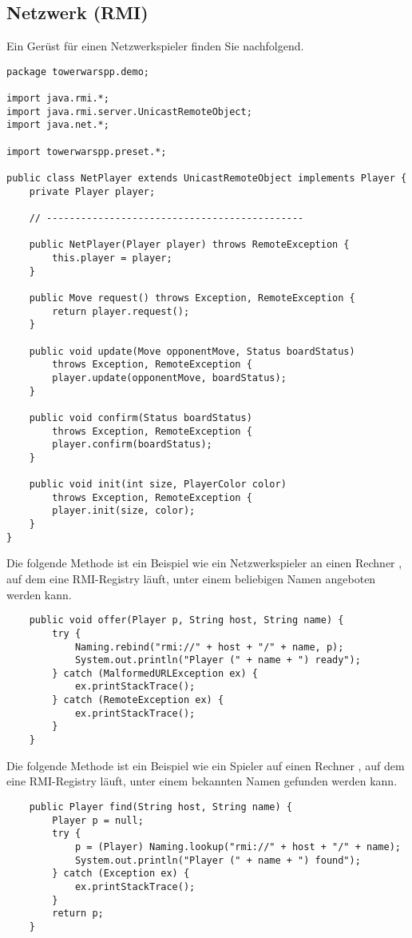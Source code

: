 \newpage
\subsection*{Netzwerk (RMI)}
Ein Gerüst für einen Netzwerkspieler finden Sie nachfolgend.
\begin{lstlisting}
package towerwarspp.demo;

import java.rmi.*;
import java.rmi.server.UnicastRemoteObject;
import java.net.*;

import towerwarspp.preset.*;

public class NetPlayer extends UnicastRemoteObject implements Player {
	private Player player;
	
	// ---------------------------------------------
	
	public NetPlayer(Player player) throws RemoteException {
		this.player = player;
	}
	
	public Move request() throws Exception, RemoteException {
		return player.request();
	}
	
	public void update(Move opponentMove, Status boardStatus)
		throws Exception, RemoteException {
		player.update(opponentMove, boardStatus);
	}
	
	public void confirm(Status boardStatus)
		throws Exception, RemoteException {
		player.confirm(boardStatus);
	}		
	
	public void init(int size, PlayerColor color)
		throws Exception, RemoteException {
		player.init(size, color);	
	} 
}
\end{lstlisting}

Die folgende Methode  ist ein Beispiel wie ein Netzwerkspieler an einen Rechner , auf dem eine RMI-Registry läuft, unter einem beliebigen Namen  angeboten werden kann.
\begin{lstlisting}
	public void offer(Player p, String host, String name) {
		try {
			Naming.rebind("rmi://" + host + "/" + name, p);
			System.out.println("Player (" + name + ") ready");
		} catch (MalformedURLException ex) {
			ex.printStackTrace();
		} catch (RemoteException ex) {
			ex.printStackTrace();
		}
	}
\end{lstlisting}

Die folgende Methode  ist ein Beispiel wie ein Spieler auf einen Rechner , auf dem eine RMI-Registry läuft, unter einem bekannten Namen  gefunden werden kann.
\begin{lstlisting}
	public Player find(String host, String name) {
		Player p = null;
		try {
			p = (Player) Naming.lookup("rmi://" + host + "/" + name);
			System.out.println("Player (" + name + ") found");
		} catch (Exception ex) {
			ex.printStackTrace();
		}
		return p;
	}
\end{lstlisting}
